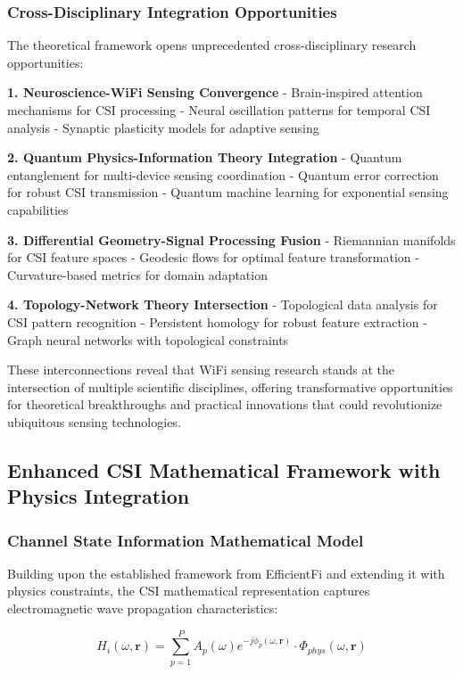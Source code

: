 \documentclass[journal]{IEEEtran}
\begin{document}
\subsubsection{Cross-Disciplinary Integration Opportunities}

The theoretical framework opens unprecedented cross-disciplinary research opportunities:

\textbf{1. Neuroscience-WiFi Sensing Convergence}
- Brain-inspired attention mechanisms for CSI processing
- Neural oscillation patterns for temporal CSI analysis
- Synaptic plasticity models for adaptive sensing

\textbf{2. Quantum Physics-Information Theory Integration}
- Quantum entanglement for multi-device sensing coordination
- Quantum error correction for robust CSI transmission
- Quantum machine learning for exponential sensing capabilities

\textbf{3. Differential Geometry-Signal Processing Fusion}
- Riemannian manifolds for CSI feature spaces
- Geodesic flows for optimal feature transformation
- Curvature-based metrics for domain adaptation

\textbf{4. Topology-Network Theory Intersection}
- Topological data analysis for CSI pattern recognition
- Persistent homology for robust feature extraction
- Graph neural networks with topological constraints

These interconnections reveal that WiFi sensing research stands at the intersection of multiple scientific disciplines, offering transformative opportunities for theoretical breakthroughs and practical innovations that could revolutionize ubiquitous sensing technologies.

\subsection{Enhanced CSI Mathematical Framework with Physics Integration}

\subsubsection{Channel State Information Mathematical Model}

Building upon the established framework from EfficientFi \cite{chen2024efficientfi} and extending it with physics constraints, the CSI mathematical representation captures electromagnetic wave propagation characteristics:

\begin{equation}
H_i(\omega,\mathbf{r}) = \sum_{p=1}^{P} A_p(\omega) e^{-j\phi_p(\omega,\mathbf{r})} \cdot \Phi_{phys}(\omega,\mathbf{r})
\label{eq:csi_physics}
\end{equation}
\end{document}
